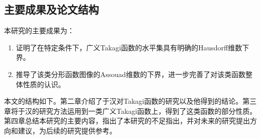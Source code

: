 \subsection{主要成果及论文结构}

本研究的主要成果为：

\begin{enumerate}
      \item 证明了在特定条件下，广义Takagi函数的水平集具有明确的Hausdorff维数下界。
      \item 推导了该类分形函数图像的Assouad维数的下界，进一步完善了对该类函数整体性质的认识。
\end{enumerate}

本文的结构如下。第二章介绍了于汉对Takagi函数的研究以及他得到的结论。第三章将于汉的研究方法运用到一类广义Takagi函数上，得到了这类函数的部分性质。第四章总结本研究的主要内容，指出了本研究的不足指出，并对未来的研究提出方向和建议，为后续的研究提供参考。
